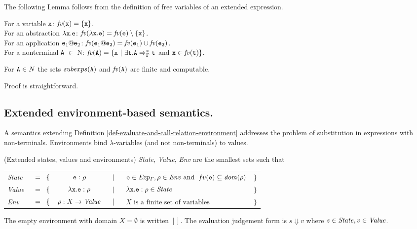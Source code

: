 \documentclass{LMCS}
\newcommand{\fl}{\noindent}
\newcommand{\hair}{\hspace{2mm}}
\newcommand{\bt}{\begin{tabular}}
\newcommand{\et}{\end{tabular}}
\newcommand{\bdfn}{\begin{defi}}
\newcommand{\edfn}{\end{defi}}
\newcommand{\blem}{\begin{lem}}
\newcommand{\elem}{\end{lem}}
\theoremstyle{definition}\newtheorem{env}[thm]{Environment}
\begin{document}
The following Lemma follows from the definition of free variables of
an extended expression.

\blem
For a variable ${\tt x}$: $\mathit{fv}({\tt x}) = \{ {\tt x}\}$.\\
For an abstraction $\lambda {\tt x}.{\tt e}$: $\mathit{fv}(\lambda {\tt x}.{\tt e}) = \mathit{fv}({\tt e}) \setminus \{{\tt x} \}$.\\
For an application ${\tt e}_1{\tt @e}_2$: $\mathit{fv}({\tt e}_1{\tt @e}_2) = \mathit{fv}({\tt e}_1)\cup \mathit{fv}({\tt e}_2)$.\\
For a nonterminal {\tt A} $\in$ N: $\mathit{fv}({\tt A}) = \{{\tt x}\ |\  \exists {\tt t}. {\tt A}\Rightarrow^*_\Gamma {\tt t}$ and ${\tt x}\in \mathit{fv}({\tt t})\}$. 
\elem

\blem\label{lem:fin-subexp-fv}
For ${\tt A}\in N$ the sets $subexps({\tt A})$ and $\mathit{fv}({\tt A})$ are finite and computable.
\elem

Proof is straightforward.

\subsection{Extended environment-based semantics.}

A  semantics extending Definition \ref{def-evaluate-and-call-relation-environment}
addresses the problem of substitution in expressions with non-terminals. Environments  bind $\lambda$-variables (and not  non-terminals) to values. 

\bdfn \label{def-environment-etc-ext} {\rm (Extended states, values and environments)}
{\it State}, {\it Value}, {\it Env} are the smallest
sets such that
\vspace{1mm}

\fl\bt{lccclr}

{\it State} &$\hair=\hair\{$&  ${\tt e}:\rho$
&$\hair|\hair$& ${\tt e}\in{\it Exp_\Gamma},
\rho\in{\it Env}\mbox{\ and \ }
{\mathit fv}({\tt e})\subseteq {\it dom}(\rho)$&$\}$\\

{\it Value} &$\hair=\hair\{$&  $\lambda{\tt x.e}:\rho$
&$\hair|\hair$& $
\lambda{\tt x.e}:\rho\in{\it State}$&$\}$\\

{\it Env} &$\hair=\hair\{$& $ \rho:X\to {\it Value}$
&$\hair|\hair$& $X\mbox{\  is a finite set of variables}$&$\}$
\et
\bigskip

\fl
The empty environment with  domain $X=\emptyset$ is written $[]$.
The evaluation judgement form is
$s\Downarrow v$ where $s\in{\it State}, v \in {\it Value}$.
\edfn
\end{document}
